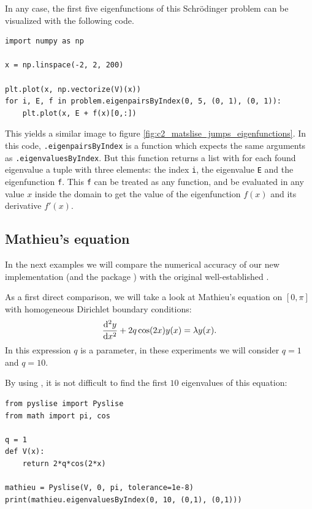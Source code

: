 In any case, the first five eigenfunctions of this Schrödinger problem can be visualized with the following code.
\begin{verbatim}
import numpy as np

x = np.linspace(-2, 2, 200)

plt.plot(x, np.vectorize(V)(x))
for i, E, f in problem.eigenpairsByIndex(0, 5, (0, 1), (0, 1)):
    plt.plot(x, E + f(x)[0,:])
\end{verbatim}
This yields a similar image to figure \ref{fig:c2_matslise_jumps_eigenfunctions}. In this code, \texttt{.eigenpairsByIndex} is a function which expects the same arguments as \texttt{.eigenvaluesByIndex}. But this function returns a list with for each found eigenvalue a tuple with three elements: the index \texttt{i}, the eigenvalue \texttt{E} and the eigenfunction \texttt{f}. This \texttt{f} can be treated as any \lpython{} function, and be evaluated in any value $x$ inside the domain to get the value of the eigenfunction $f(x)$ and its derivative $f'(x)$.

\subsection{Mathieu's equation}\label{sec:c2_numerical_experiments_mathieu}

In the next examples we will compare the numerical accuracy of our new implementation  (and the \lpython{} package \pyslise{}) with the original well-established .

As a first direct comparison, we will take a look at Mathieu's equation \cite{pryce_sltstpak_1999} on $[0, \pi]$ with homogeneous Dirichlet boundary conditions: \begin{equation}
    \dv[2]{y}{x} + 2q\cos(2x)y(x) = \lambda y(x) \text{.}\label{equ:c2_mathieu_equation}
\end{equation}
In this expression $q$ is a parameter, in these experiments we will consider $q=1$ and $q=10$.

By using \pyslise{}, it is not difficult to find the first $10$ eigenvalues of this equation:

\begin{verbatim}
from pyslise import Pyslise
from math import pi, cos

q = 1
def V(x):
    return 2*q*cos(2*x)

mathieu = Pyslise(V, 0, pi, tolerance=1e-8)
print(mathieu.eigenvaluesByIndex(0, 10, (0,1), (0,1)))
\end{verbatim}

